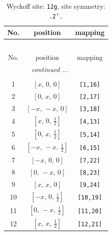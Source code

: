 \documentclass[fleqn,8pt]{jsarticle}
\begin{document}
\renewcommand{\arraystretch}{1.2}
\begin{longtable}{ccc}
\caption{Wyckoff site: {\tt 12g}, site symmetry: {\tt .2'.}}
 \\
 \hline \hline
No. & position & mapping \\ \hline \endfirsthead

\multicolumn{2}{l}{\tablename\ \thetable{}} \\
 \hline \hline
No. & position & mapping \\ \hline \endhead

 \hline \hline
\multicolumn{2}{r}{\footnotesize\it continued ...} \\ \endfoot

 \hline \hline
\multicolumn{2}{r}{} \\ \endlastfoot

1 & $\left[ x,\, 0,\, 0 \right]$ & {\tt [1,16]} \\ \hline
2 & $\left[ 0,\, x,\, 0 \right]$ & {\tt [2,17]} \\ \hline
3 & $\left[ - x,\, - x,\, 0 \right]$ & {\tt [3,18]} \\ \hline
4 & $\left[ x,\, 0,\, \frac{1}{2} \right]$ & {\tt [4,13]} \\ \hline
5 & $\left[ 0,\, x,\, \frac{1}{2} \right]$ & {\tt [5,14]} \\ \hline
6 & $\left[ - x,\, - x,\, \frac{1}{2} \right]$ & {\tt [6,15]} \\ \hline
7 & $\left[ - x,\, 0,\, 0 \right]$ & {\tt [7,22]} \\ \hline
8 & $\left[ 0,\, - x,\, 0 \right]$ & {\tt [8,23]} \\ \hline
9 & $\left[ x,\, x,\, 0 \right]$ & {\tt [9,24]} \\ \hline
10 & $\left[ - x,\, 0,\, \frac{1}{2} \right]$ & {\tt [10,19]} \\ \hline
11 & $\left[ 0,\, - x,\, \frac{1}{2} \right]$ & {\tt [11,20]} \\ \hline
12 & $\left[ x,\, x,\, \frac{1}{2} \right]$ & {\tt [12,21]} \\
\end{longtable}
\renewcommand{\arraystretch}{1.2}
\end{document}
